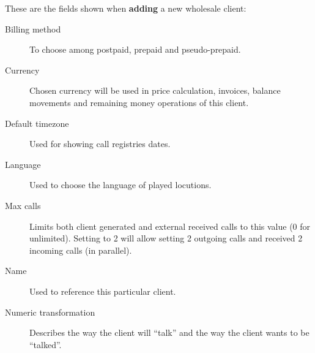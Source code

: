 \documentclass[letterpaper,10pt,english]{sphinxmanual}
\begin{document}
These are the fields shown when \textbf{adding} a new wholesale client:
\begin{description}
\item[{Billing method}] \leavevmode{}\label{administration_portal/brand/clients/wholesale:term-billing-method}
To choose among postpaid, prepaid and pseudo-prepaid.

\item[{Currency}] \leavevmode{}\label{administration_portal/brand/clients/wholesale:term-currency}
Chosen currency will be used in price calculation, invoices, balance movements and
remaining money operations of this client.

\item[{Default timezone}] \leavevmode{}\label{administration_portal/brand/clients/wholesale:term-default-timezone}
Used for showing call registries dates.

\item[{Language}] \leavevmode{}\label{administration_portal/brand/clients/wholesale:term-language}
Used to choose the language of played locutions.

\item[{Max calls}] \leavevmode{}\label{administration_portal/brand/clients/wholesale:term-max-calls}
Limits both client generated and external received calls to this value (0 for unlimited). Setting to 2 will allow
setting 2 outgoing calls and received 2 incoming calls (in parallel).

\item[{Name}] \leavevmode{}\label{administration_portal/brand/clients/wholesale:term-name}
Used to reference this particular client.

\item[{Numeric transformation}] \leavevmode{}\label{administration_portal/brand/clients/wholesale:term-numeric-transformation}
Describes the way the client will ``talk'' and the way the client wants to be ``talked''.

\end{description}
\end{document}
